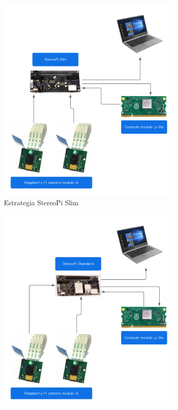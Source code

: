 \begin{figure}[H]
     \centering
     \begin{subfigure}[b]{0.4\textwidth}
        \centering
        \includegraphics[scale=0.4]{Recursos/estrategia_stereopi_slim.png}
        \caption{Estrategia StereoPi Slim}
        \label{estrategia_slim}
     \end{subfigure}
     \hfill
     \begin{subfigure}[b]{0.4\textwidth}
         \centering
        \includegraphics[scale=0.4]{Recursos/estrategia_stereo_pi_standard.png}

\end{subfigure}
\end{figure}
